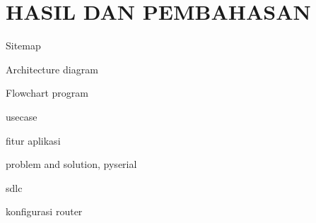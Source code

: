 
\chapter{HASIL DAN PEMBAHASAN}

Sitemap

Architecture diagram

Flowchart program

usecase

fitur aplikasi

problem and solution, pyserial

sdlc

konfigurasi router
